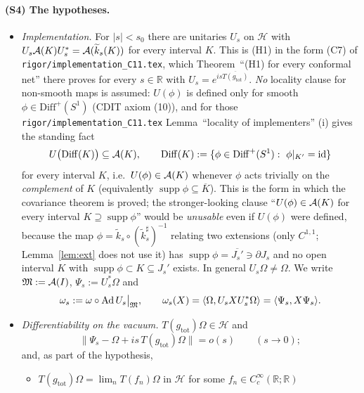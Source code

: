 \documentclass[11pt]{article}
\newcommand{\Om}{\Omega}
\newcommand{\Hil}{\mathcal H}
\newcommand{\ip}[2]{\langle#1,#2\rangle}
\newcommand{\norm}[1]{\lVert#1\rVert}
\newcommand{\kt}{\widetilde k}
\newcommand{\gtot}{g_{\mathrm{tot}}}
\newcommand{\Ad}{\operatorname{Ad}}
\newcommand{\supp}{\operatorname{supp}}
\begin{document}
\paragraph{(S4) The hypotheses.}
\begin{itemize}[leftmargin=3em]
\item[(H1)] \emph{Implementation.}  For $|s|<s_0$ there are unitaries $U_s$ on $\Hil$ with
 $U_s\cA(K)U_s^*=\cA(\kt_s(K))$ for every interval $K$.  This is (H1) in the form (C7) of
 \texttt{rigor/implementation\_C11.tex}, which Theorem~``(H1) for every conformal net'' there proves for every
 $s\in\mathbb R$ with $U_s=e^{is\overline{T(\gtot)}}$.  \emph{No} locality clause for non-smooth maps is assumed:
 $U(\phi)$ is defined only for smooth $\phi\in\mathrm{Diff}^+(S^1)$ (CDIT axiom (10)), and for those
 \texttt{rigor/implementation\_C11.tex} Lemma~``locality of implementers'' (i) gives the standing fact
 \begin{equation}\label{eq:H1loc}
  U\bigl(\mathrm{Diff}(K)\bigr)\subseteq\cA(K),\qquad
  \mathrm{Diff}(K):=\{\phi\in\mathrm{Diff}^+(S^1):\ \phi|_{K'}=\mathrm{id}\}
 \end{equation}
 for every interval $K$, i.e.\ $U(\phi)\in\mathcal A(K)$ whenever $\phi$ acts trivially on the \emph{complement}
 of $K$ (equivalently $\supp\phi\subseteq\overline K$).  This is the form in which the covariance theorem
 is proved; the stronger-looking clause ``$U(\phi)\in\mathcal A(K)$ for every interval $K\supseteq\supp\phi$''
 would be \emph{unusable} even if $U(\phi)$ were defined, because the map $\phi=\kt_s\circ(\kt^\sharp_s)^{-1}$
 relating two extensions (only $C^{1,1}$; Lemma~\ref{lem:ext} does not use it) has
 $\supp\phi=\overline{J_s'}\ni\partial J_s$ and no open interval $K$ with
 $\supp\phi\subset K\subseteq J_s'$ exists.  In general $U_s\Om\ne\Om$.  We write $\mathfrak M:=\mathcal A(I)$,
 $\Psi_s:=U_s^*\Om$ and
 \begin{equation}\label{eq:omegas}
  \omega_s:=\omega\circ\Ad U_s\big|_{\cM},\qquad \omega_s(X)=\ip{\Om}{U_sXU_s^*\Om}=\ip{\Psi_s}{X\Psi_s}.
 \end{equation}
\item[(H2)] \emph{Differentiability on the vacuum.}  $T(\gtot)\Om\in\Hil$ and
 \begin{equation}\label{eq:H2}
  \norm{\Psi_s-\Om+is\,T(\gtot)\Om}=o(s)\qquad(s\to0);
 \end{equation}
 and, as part of the hypothesis,
 \begin{itemize}[leftmargin=1.6em]
 \item[(H2$'$)] $T(\gtot)\Om=\lim_nT(f_n)\Om$ in $\Hil$ for some $f_n\in C^\infty_c(\mathbb R;\mathbb R)$

\end{itemize}
\end{itemize}
\end{document}
